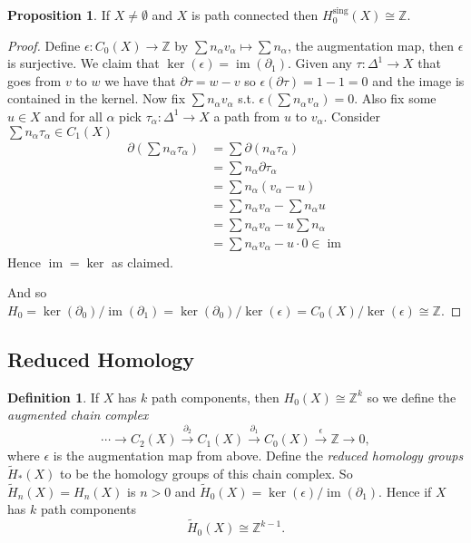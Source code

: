 \documentclass[12pt]{article}
\theoremstyle{definition}
\newtheorem{prop}[thm]{Proposition}
\theoremstyle{definition}
\newtheorem{defn}[thm]{Definition}
\newcommand{\ZZ}{\mathbb{Z}}
\renewcommand{\H}{H_*}
\DeclareMathOperator{\im}{im}
\begin{document}
\begin{prop}
If $X \ne \emptyset$ and $X$ is path connected then $H_0^\text{sing}(X) \cong \ZZ$.
\end{prop}
\begin{proof}
Define $\epsilon\colon C_0(X) \to \ZZ$ by $\sum n_\alpha v_\alpha \mapsto \sum n_\alpha$, the augmentation map, then $\epsilon$ is surjective.
We claim that $\ker(\epsilon) = \im(\partial_1)$.
Given any $\tau\colon \Delta^1 \to X$ that goes from $v$ to $w$ we have that $\partial\tau = w-v$ so $\epsilon(\partial \tau) = 1-1 =0$ and the image is contained in the kernel.
Now fix $\sum n_\alpha v_\alpha$ s.t. $\epsilon(\sum n_\alpha v_\alpha) = 0$.
Also fix some $u\in X$ and for all $\alpha$ pick $\tau_\alpha\colon\Delta^1 \to X$ a path from $u$ to $v_\alpha$.
Consider $\sum n_\alpha \tau_\alpha\in C_1 (X)$
\begin{align*}
\partial\left(\sum n_\alpha \tau_\alpha\right) &= \sum \partial(n_\alpha \tau_\alpha)\\
&= \sum n_\alpha\partial\tau_\alpha\\
&= \sum n_\alpha(v_\alpha - u) \\
&= \sum n_\alpha v_\alpha - \sum n_\alpha u \\
&= \sum n_\alpha v_\alpha - u\sum n_\alpha \\
&= \sum n_\alpha v_\alpha -u\cdot 0\in \im
\end{align*}
Hence $\im = \ker$ as claimed.

And so $H_0 = \ker(\partial_0)/\im(\partial_1) = \ker(\partial_0)/\ker(\epsilon) = C_0(X) /\ker(\epsilon) \cong \ZZ$.
\end{proof}

\subsection{Reduced Homology}
\begin{defn}
If $X$ has $k$ path components, then $H_0(X) \cong \ZZ^k$ so we define the \emph{augmented chain complex}
\[
\cdots \to C_2(X) \xrightarrow{\partial_2}C_1(X) \xrightarrow{\partial_1}C_0(X) \xrightarrow{\epsilon} \ZZ \to 0,
\]
where $\epsilon$ is the augmentation map from above.
Define the \emph{reduced homology groups} $\tilde \H (X)$ to be the homology groups of this chain complex.
So $\tilde H_n(X) = H_n(X)$ is $n> 0$ and $\tilde H_0(X) = \ker(\epsilon)/\im(\partial_1)$.
Hence if $X$ has $k$ path components
\[
\tilde H_0(X) \cong \ZZ^{k-1}.
\]
\end{defn}
\end{document}
